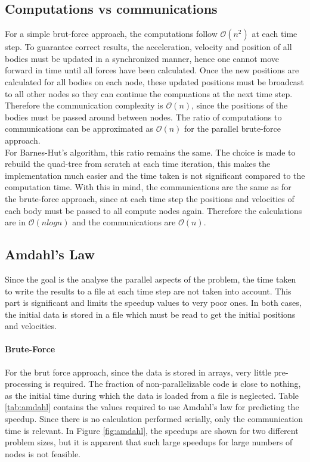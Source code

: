 \subsection{Computations vs communications}
For a simple brut-force approach, the computations follow $\mathcal{O}(n^2)$ at each time step. To guarantee correct results, the acceleration, velocity and position of all bodies must be updated in a synchronized manner, hence one cannot move forward in time until all forces have been calculated. Once the new positions are calculated for all bodies on each node, these updated positions must be broadcast to all other nodes so they can continue the compuations at the next time step. Therefore the communication complexity is $\mathcal{O}(n)$, since the positions of the bodies must be passed around between nodes. The ratio of computations to communications can be approximated as $\mathcal{O}(n)$ for the parallel brute-force approach.\\
For Barnes-Hut's algorithm, this ratio remains the same. The choice is made to rebuild the quad-tree from scratch at each time iteration, this makes the implementation much easier and the time taken is not significant compared to the computation time. With this in mind, the communications are the same as for the brute-force approach, since at each time step the positions and velocities of each body must be passed to all compute nodes again. Therefore the calculations are in $\mathcal{O}(nlogn)$ and the communications are $\mathcal{O}(n)$.
\subsection{Amdahl's Law}
Since the goal is the analyse the parallel aspects of the problem, the time taken to write the results to a file at each time step are not taken into account. This part is significant and limits the speedup values to very poor ones. In both cases, the initial data is stored in a file which must be read to get the initial positions and velocities.  
\paragraph{Brute-Force} For the brut force approach, since the data is stored in arrays, very little pre-processing is required. The fraction of non-parallelizable code is close to nothing, as the initial time during which the data is loaded from a file is neglected. Table \ref{tab:amdahl} contains the values required to use Amdahl's law for predicting the speedup. Since there is no calculation performed serially, only the communication time is relevant. In Figure \ref{fig:amdahl}, the speedups are shown for two different problem sizes, but it is apparent that such large speedups for large numbers of nodes is not feasible.


